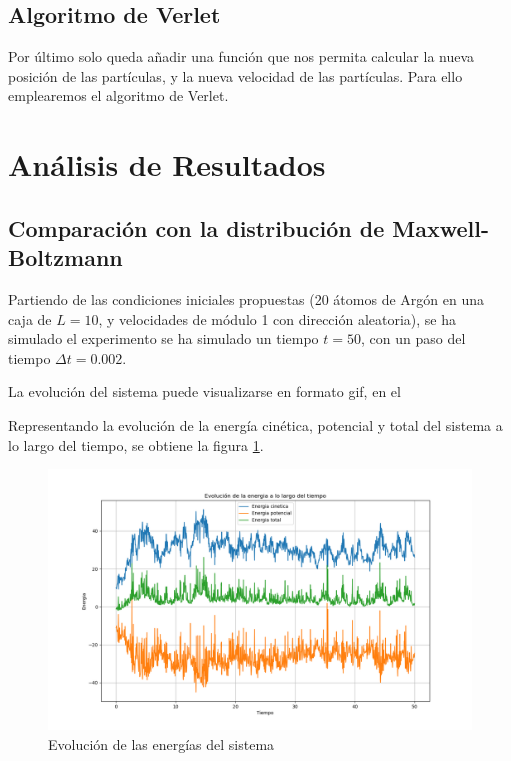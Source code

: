 \documentclass[11pt, twoside]{article} %
\begin{document}
\subsection{Algoritmo de Verlet}

Por último solo queda añadir una función que nos permita calcular la nueva posición
de las partículas, y la nueva velocidad de las partículas. Para ello emplearemos el
algoritmo de Verlet. 

\section{Análisis de Resultados}

\subsection{Comparación con la distribución de Maxwell-Boltzmann}

Partiendo de las condiciones iniciales propuestas (20 átomos de Argón en una caja 
de $L=10$, y velocidades de módulo 1 con dirección aleatoria), se ha simulado el
experimento se ha simulado un tiempo $t = 50$, con un paso del tiempo 
$\Delta t = 0.002$.

La evolución del sistema puede visualizarse en formato gif, en el 

Representando la evolución de la energía cinética, potencial y total del sistema
a lo largo del tiempo, se obtiene la figura \ref{fig:energias}.

\begin{figure}[h!]
    \centering
    \includegraphics[width=\textwidth]{plots/energia_1.png}
    \caption{Evolución de las energías del sistema}
    \label{fig:energias}
\end{figure}
\end{document}
